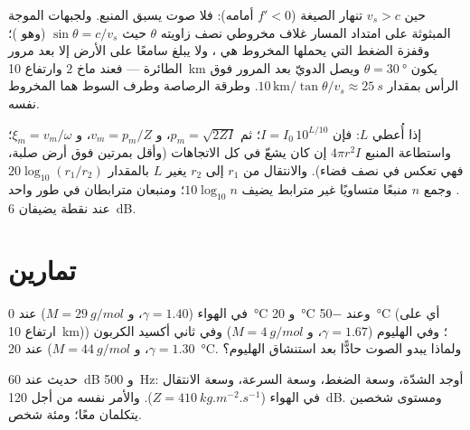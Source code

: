 \begin{remark}\label{rem:b2:sound-waves:mach}
حين $v_s > c$ تنهار الصيغة ($f' < 0$ أمامه): فلا صوت يسبق
المنبع. ولجبهات الموجة المبثوثة على امتداد المسار غلاف
مخروطي نصف زاويته $\theta$ حيث $\sin\theta = c/v_s$ (وهو \emph{})؛
وقفزة الضغط التي يحملها المخروط هي ، ولا يبلغ
سامعًا على الأرض إلا بعد مرور الطائرة --- فعند
ماخ $2$ وارتفاع \qty{10}{km} يكون $\theta = \qty{30}{\degree}$ ويصل الدويّ
بعد المرور فوق الرأس بمقدار $10\,\text{km}/\tan\theta/v_s \approx \qty{25}{s}$.
وطرقة الرصاصة وطرف السوط هما المخروط نفسه.
\end{remark}

\begin{method}\label{met:b2:sound-waves:method}
إذا أُعطي  $L$: فإن $I = I_0\,10^{L/10}$؛ ثم $p_m = \sqrt{2ZI}$،
و $v_m = p_m/Z$، و $\xi_m = v_m/\omega$؛ واستطاعة المنبع $4\pi r^2I$ إن كان
يشعّ في كل الاتجاهات (وأقل بمرتين فوق أرض صلبة، فهي
تعكس في نصف فضاء). والانتقال من $r_1$ إلى $r_2$ يغير $L$ بالمقدار
$20\log_{10}(r_1/r_2)$. وجمع $n$ منبعًا متساويًا غير مترابط يضيف
$10\log_{10}n$؛ ومنبعان مترابطان في طور واحد عند نقطة يضيفان \qty{6}{dB}.
\end{method}

\section{تمارين}

\begin{exercise}[$\star$]\label{exo:b2:sound-waves:1}
 في الهواء ($\gamma = 1.40$، و $M = \qty{29}{g/mol}$) عند
\qty{0}{\degreeCelsius} و \qty{20}{\degreeCelsius} وعند \qty{-50}{\degreeCelsius}
(أي على ارتفاع \qty{10}{km})؛ وفي الهليوم ($\gamma = 1.67$، و $M = \qty{4}{g/mol}$) وفي
ثاني أكسيد الكربون ($\gamma = 1.30$، و $M = \qty{44}{g/mol}$) عند \qty{20}{\degreeCelsius}.
ولماذا يبدو الصوت حادًّا بعد استنشاق الهليوم؟
\end{exercise}

\begin{exercise}[$\star$]\label{exo:b2:sound-waves:2}
حديث عند \qty{60}{dB} و \qty{500}{Hz}: أوجد الشدّة، وسعة الضغط،
وسعة السرعة، وسعة الانتقال في الهواء
($Z = \qty{410}{kg.m^{-2}.s^{-1}}$). والأمر نفسه من أجل \qty{120}{dB}. ومستوى شخصين
يتكلمان معًا؛ ومئة شخص.
\end{exercise}

